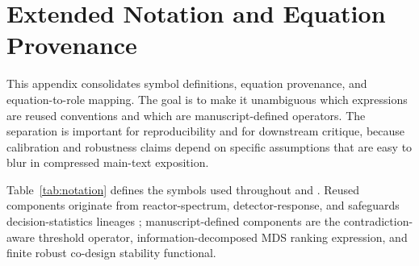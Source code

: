\clearpage{}\label{sec:appendix_start}

\section{Extended Notation and Equation Provenance}\label{sec:appendix_notation}
This appendix consolidates symbol definitions, equation provenance, and equation-to-role mapping. The goal is to make it unambiguous which expressions are reused conventions and which are manuscript-defined operators. The separation is important for reproducibility and for downstream critique, because calibration and robustness claims depend on specific assumptions that are easy to blur in compressed main-text exposition.

Table~\ref{tab:notation} defines the symbols used throughout  and . Reused components originate from reactor-spectrum, detector-response, and safeguards decision-statistics lineages \citep{SRC014,SRC030,SRC023,SRC009,SRC017}; manuscript-defined components are the contradiction-aware threshold operator, information-decomposed MDS ranking expression, and finite robust co-design stability functional.

